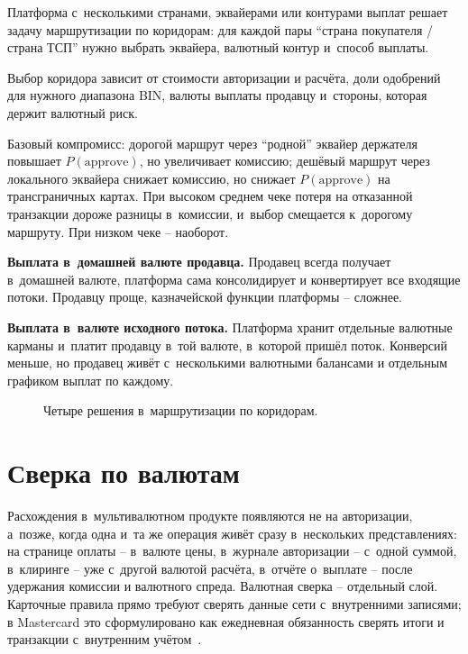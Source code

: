 Платформа с~несколькими странами, эквайерами или контурами
выплат решает задачу маршрутизации по коридорам: для каждой
пары \enquote{страна покупателя / страна ТСП} нужно выбрать
эквайера, валютный контур и~способ выплаты.

Выбор коридора зависит от стоимости авторизации и расчёта,
доли одобрений для нужного диапазона BIN, валюты выплаты
продавцу и~стороны, которая держит валютный риск.

Базовый компромисс: дорогой маршрут через \enquote{родной}
эквайер держателя повышает \(P(\text{approve})\), но
увеличивает комиссию; дешёвый маршрут через локального
эквайера снижает комиссию, но снижает \(P(\text{approve})\)
на трансграничных картах. При высоком среднем чеке потеря
на отказанной транзакции дороже разницы в~комиссии,
и~выбор смещается к~дорогому маршруту. При низком чеке --
наоборот.

\textbf{Выплата в~домашней валюте продавца.} Продавец всегда
получает в~домашней валюте, платформа сама консолидирует
и конвертирует все входящие потоки. Продавцу проще,
казначейской функции платформы -- сложнее.

\textbf{Выплата в~валюте исходного потока.} Платформа хранит
отдельные валютные карманы и~платит продавцу в~той валюте,
в~которой пришёл поток. Конверсий меньше, но продавец живёт
с~несколькими валютными балансами и отдельным графиком
выплат по каждому.

\begin{figure}[tbp]
  \centering
  \caption{Четыре решения в~маршрутизации по коридорам.}\label{fig:corridor-routing}
\end{figure}

\section{Сверка по валютам}\label{sec:mc-fx-risk}

Расхождения в~мультивалютном продукте появляются
не на авторизации, а~позже, когда одна и~та же операция
живёт сразу в~нескольких представлениях: на странице оплаты --
в~валюте цены, в~журнале авторизации -- с~одной суммой,
в~клиринге -- уже с~другой валютой расчёта, в~отчёте
о~выплате -- после удержания комиссии и валютного спреда.
Валютная сверка -- отдельный слой. Карточные правила прямо
требуют сверять данные сети с~внутренними записями;
в Mastercard это сформулировано как ежедневная обязанность
сверять итоги и транзакции с~внутренним учётом~\cite{mc-rules}.

